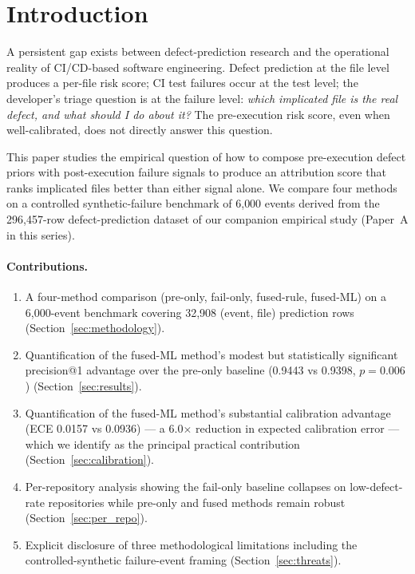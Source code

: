 \documentclass[sigconf,nonacm,review]{acmart}
\begin{document}
\maketitle

\section{Introduction}
\label{sec:intro}

A persistent gap exists between defect-prediction research and the
operational reality of CI/CD-based software engineering. Defect
prediction at the file level produces a per-file risk score; CI
test failures occur at the test level; the developer's triage
question is at the failure level: \emph{which implicated file is the
real defect, and what should I do about it?} The pre-execution risk
score, even when well-calibrated, does not directly answer this
question.

This paper studies the empirical question of how to compose
pre-execution defect priors with post-execution failure signals to
produce an attribution score that ranks implicated files better than
either signal alone. We compare four methods on a controlled
synthetic-failure benchmark of 6{,}000 events derived from the
296{,}457-row defect-prediction dataset of our companion empirical
study (Paper~A in this series).

\paragraph{Contributions.}

\begin{enumerate}
  \item A four-method comparison (pre-only, fail-only, fused-rule,
        fused-ML) on a 6{,}000-event benchmark covering 32{,}908
        (event, file) prediction rows
        (Section~\ref{sec:methodology}).
  \item Quantification of the fused-ML method's modest but
        statistically significant precision@1 advantage over the
        pre-only baseline (0.9443 vs 0.9398, $p = 0.006$)
        (Section~\ref{sec:results}).
  \item Quantification of the fused-ML method's substantial
        calibration advantage (ECE 0.0157 vs 0.0936) ---
        a 6.0$\times$ reduction in expected calibration error ---
        which we identify as the principal practical contribution
        (Section~\ref{sec:calibration}).
  \item Per-repository analysis showing the fail-only baseline
        collapses on low-defect-rate repositories while pre-only and
        fused methods remain robust (Section~\ref{sec:per_repo}).
  \item Explicit disclosure of three methodological limitations
        including the controlled-synthetic failure-event framing
        (Section~\ref{sec:threats}).
\end{enumerate}
\end{document}
